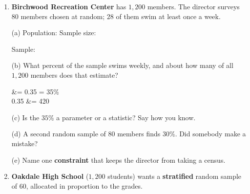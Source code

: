 \documentclass[10pt]{article}
\begin{document}
\begin{enumerate}[leftmargin=2.2em, itemsep=9pt, topsep=2pt]
(b) Rewrite it as a statistical question about the library's cardholders.

\par{}

(c) The data your question collects will be categorical or quantitative? 

\boxguard[22]
\item \textbf{Birchwood Recreation Center} has $1{,}200$ members. The director surveys $80$
members chosen at random; $28$ of them swim at least once a week.

\vspace{2pt}
(a) Population:  \quad Sample size: 

\vspace{3pt}
Sample: 

\vspace{3pt}
(b) What percent of the sample swims weekly, and about how many of all $1{,}200$ members
does that estimate?

\begin{work}
   &= 0.35 = 35\% \\
  0.35  &= 420 
\end{work}

(c) Is the $35\%$ a parameter or a statistic? Say how you know.

\par{}

(d) A second random sample of $80$ members finds $30\%$. Did somebody make a mistake?

\par{}

(e) Name one \textbf{constraint} that keeps the director from taking a census.

\par{}

\boxguard[26]
\item \textbf{Oakdale High School} ($1{,}200$ students) wants a \textbf{stratified} random
sample of $60$, allocated in proportion to the grades.


\end{enumerate}
\end{document}
